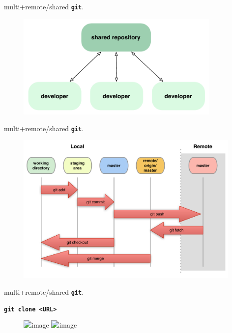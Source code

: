 \documentclass{beamer}
\newcommand{\git}{\texttt{\textbf{git}}\xspace}
\begin{document}
\begin{frame}{multi+remote/shared \git.}
  \begin{figure}
    \centering
    \includegraphics[width=10cm]{figs/workflow-a}
  \end{figure}
\end{frame}

\begin{frame}{multi+remote/shared \git.}
  \begin{figure}
    \centering
    \includegraphics[width=11cm]{figs/local-remote}
  \end{figure}  
\end{frame}

\begin{frame}{multi+remote/shared \git.}
  \begin{center}
    \texttt{\textbf{git clone <URL>}}
  \end{center}
  \begin{figure}
    \begin{center}
      \includegraphics<1>[width=9cm]{figs/local-remote-before-clone}
      \includegraphics<2>[width=9cm]{figs/local-remote-clone2}
    \end{center}
  \end{figure}
\end{frame}
\end{document}
